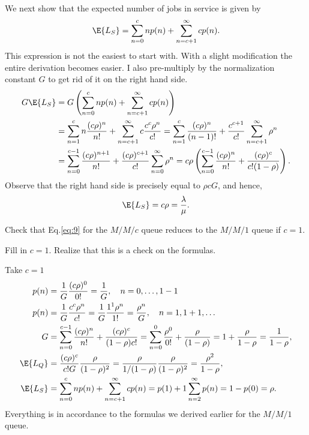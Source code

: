\begin{exercise}
\begin{solution}
We next show that the expected number of jobs in service is given
by
    \begin{equation*}
      \E{L_S} = \sum_{n=0}^{c} n p(n) + \sum_{n=c+1}^{\infty} c p(n).
    \end{equation*}
    This expression is not the easiest to start with. With a slight
    modification the entire derivation becomes easier. I also pre-multiply by the normalization constant $G$ to get rid of it on the right hand side. 
    \begin{align*}
      G \E{L_S}
&= G \left( \sum_{n=0}^{c} n p(n) + \sum_{n=c+1}^{\infty} c p(n) \right) \\
&= \sum_{n=1}^{c} n \frac{(c\rho)^n}{n!}  + \sum_{n=c+1}^{\infty} c \frac{c^c\rho^n}{c!} 
= \sum_{n=1}^{c} \frac{(c\rho)^n}{(n-1)!}  + \frac{c^{c+1}}{c!}\sum_{n=c+1}^{\infty} \rho^n\\
&= \sum_{n=0}^{c-1} \frac{(c\rho)^{n+1}}{n!}  + \frac{(c\rho)^{c+1}}{c!}\sum_{n=0}^{\infty} \rho^n
= c\rho \left(\sum_{n=0}^{c-1} \frac{(c\rho)^n}{n!}  + \frac{(c\rho)^{c}}{c!(1-\rho)}\right).
    \end{align*}
Observe that the right hand side is precisely equal to $\rho c G$, and hence,
\begin{equation*}
  \E{L_S} = c\rho = \frac\lambda\mu.
\end{equation*}
\end{solution}
\end{exercise}

\begin{exercise}{\faFlask}
  Check that  Eq.\eqref{eq:9} for the $M/M/c$ queue reduces to the $M/M/1$ queue if $c=1$.
  \begin{hint}
Fill in $c=1$. Realize that this is a check on the formulas.
  \end{hint}
  \begin{solution}
Take $c=1$
\begin{subequations}
 \begin{align}
p(n) &= \frac{1}G \frac{(c\rho)^0}{0!}=\frac1 G, \quad n=0,\ldots, 1-1 \\
p(n) &= \frac{1}G \frac{c^c\rho^n}{c!} = \frac{1}G \frac{1^1\rho^n}{1!} =\frac{\rho^n}G , \quad n=1,1+1, \ldots \\
G &=\sum_{n=0}^{c-1} \frac{(c\rho)^n}{n!} + \frac{(c\rho)^c}{(1-\rho)c!}
=\sum_{n=0}^{0} \frac{\rho^0}{0!} + \frac{\rho}{(1-\rho)} = 1 + \frac{\rho}{1-\rho} = \frac1{1-\rho},
\\
\E{L_Q} &= \frac{(c\rho)^c}{c! G}\frac{\rho}{(1-\rho)^2} = \frac{\rho}{1/(1-\rho)}\frac{\rho}{(1-\rho)^2} = \frac{\rho^2}{1-\rho}, \\
\E{L_S} &= \sum_{n=0}^{c}n p(n) + \sum_{n=c+1}^\infty c p(n) = p(1) + 1 \sum_{n=2}^\infty p(n) = 1- p(0) = \rho.
\end{align}
\end{subequations}
Everything is in accordance to the formulas we derived earlier for the $M/M/1$ queue.    
  \end{solution}
\end{exercise}


